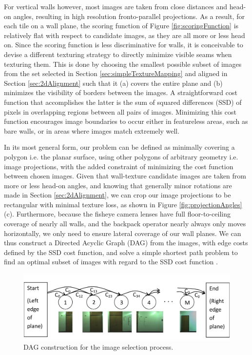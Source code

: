\documentclass{llncs}
\begin{document}
For vertical walls however, most images are taken from close distances
and head-on angles, resulting in high resolution fronto-parallel
projections. As a result, for each tile on a wall plane, the scoring
function of Figure \ref{fig:scoringFunction} is relatively flat with
respect to candidate images, as they are all more or less head
on. Since the scoring function is less discriminative for walls, it is
conceivable to devise a different texturing strategy to directly
minimize visible seams when texturing them. This is done by choosing
the smallest possible subset of images from the set selected in
Section \ref{sec:simpleTextureMapping} and aligned in Section
\ref{sec:2dAlignment} such that it (a) covers the entire plane and (b)
minimizes the visibility of borders between the images. A
straightforward cost function that accomplishes the latter is the sum
of squared differences (SSD) of pixels in overlapping regions between
all pairs of images. Minimizing this cost function encourages image
boundaries to occur either in featureless areas, such as bare walls,
or in areas where images match extremely well.

In its most general form, our problem can be defined as minimally
covering a polygon i.e. the planar surface, using other polygons of
arbitrary geometry i.e. image projections, with the added constraint
of minimizing the cost function between chosen images. Given that
wall-texture candidate images are taken from more or less head-on
angles, and knowing that generally minor rotations are made in Section
\ref{sec:2dAlignment}, we can crop our image projections to be
rectangular with minimal texture loss, as shown in Figure
\ref{fig:projectionAngles}(c). Furthermore, because the fisheye camera
lenses have full floor-to-ceiling coverage of nearly all walls, and
the backpack operator nearly always only moves horizontally, we only
need to ensure lateral coverage of our wall planes. We can thus
construct a Directed Acyclic Graph (DAG) from the images, with edge
costs defined by the SSD cost function, and solve a simple shortest
path problem to find an optimal subset of images with regard to the
SSD cost function \cite{dijkstra}.

\begin{figure}
  \centering
  \includegraphics[width=4.8in]{dagCreation.pdf}
  \caption{DAG construction for the image selection process. \\}
  \label{fig:dagCreation}
\end{figure}
\end{document}
